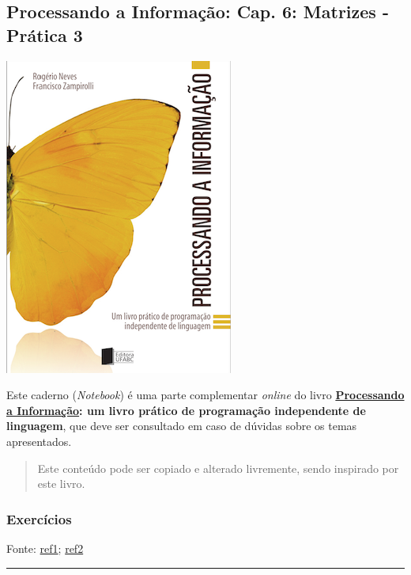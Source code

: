 \documentclass[12pt,a4paper]{article}
\renewcommand{\linethickness}{0.05em}
\begin{document}
    \hypertarget{processando-a-informauxe7uxe3o-cap.-6-matrizes---pruxe1tica-3}{%
\subsection{Processando a Informação: Cap. 6: Matrizes - Prática
3}\label{processando-a-informauxe7uxe3o-cap.-6-matrizes---pruxe1tica-3}}

    \includegraphics{"figs/Capa_Processando_Informacao.jpg"}

Este caderno (\emph{Notebook}) é uma parte complementar \emph{online} do
livro
\textbf{\href{https://editora.ufabc.edu.br/matematica-e-ciencias-da-computacao/58-processando-a-informacao}{Processando
a Informação}: um livro prático de programação independente de
linguagem}, que deve ser consultado em caso de dúvidas sobre os temas
apresentados.

\begin{quote}
Este conteúdo pode ser copiado e alterado livremente, sendo inspirado
por este livro.
\end{quote}

    \hypertarget{exercuxedcios}{%
\subsubsection{Exercícios}\label{exercuxedcios}}

Fonte:
\href{http://www.deinf.ufma.br/~csalles/prog/prog_lista2.pdf}{ref1};
\href{http://www.facom.ufu.br/~backes/wordpress/ListaC04.pdf}{ref2}

    \begin{center}\rule{0.5\linewidth}{\linethickness}\end{center}
\end{document}
